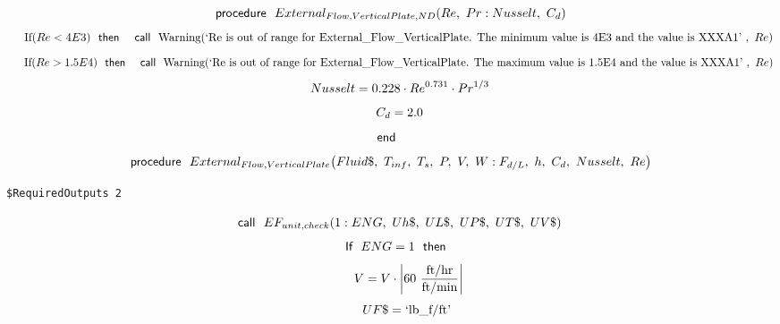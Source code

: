 \documentclass[10pt,fleqn]{article}
\newcommand{\F}[1]{\mbox{$#1$}}
\newcommand{\K}[1]{\mbox{\sf#1\ \ \mit}}
\newcommand{\KS}[1]{\mbox{\sf\ \ #1\ \ \mit}}
\newcommand{\SC}[1]{\mbox{`#1'}\  }
\newcommand{\V}[1]{\mbox{$ #1 $}}
\newcommand{\I}{\mbox{\hspace{0.20in}}}
\begin{document}
\vspace{0.1 in}
\begin{equation}
\label{EES Eqn:395}
\K{procedure} \F{External_{Flow,VerticalPlate,ND}}{ \left( \V{Re} ,\ \V{Pr} :\V{Nusselt} ,\ C_{d} \right) } 
\end{equation}
\begin{equation}
\I \label{EES Eqn:396}
\mbox{If}{ \left( \V{Re<4E3}  \right) } \KS{then} \KS{call} \mbox{Warning}{ \left( \SC{Re is out of range for External\_Flow\_VerticalPlate.  The minimum value is 4E3 and the value is XXXA1},\ \V{Re}  \right) } 
\end{equation}
\begin{equation}
\I \label{EES Eqn:397}
\mbox{If}{ \left( \V{Re>1.5E4}  \right) } \KS{then} \KS{call} \mbox{Warning}{ \left( \SC{Re is out of range for External\_Flow\_VerticalPlate.  The maximum value is 1.5E4 and the value is XXXA1},\ \V{Re}  \right) } 
\end{equation}
\begin{equation}
\I \label{EES Eqn:398}
\V{Nusselt} =0.228\cdot \V{Re} ^{0.731}\cdot \V{Pr} ^{1/3} 
\end{equation}
\begin{equation}
\I \label{EES Eqn:399}
C_{d}=2.0 
\end{equation}
\begin{equation}
\label{EES Eqn:400}
\K{end} 
\end{equation}
\vspace{0.1 in}
\begin{equation}
\label{EES Eqn:401}
\K{procedure} \F{External_{Flow,VerticalPlate}}{ \left( Fluid\$,\ T_{inf},\ T_{s},\  P,\ V,\ W: F_{d/L},\ h,\ C_{d},\ \V{Nusselt} ,\ \V{Re}  \right) } 
\end{equation}
\begin{verbatim}
$RequiredOutputs 2
\end{verbatim}  \begin{equation}
\I \label{EES Eqn:402}
\K{call} \F{EF_{unit,check}}{ \left( 1:\V{ENG} ,\ Uh\$,\ UL\$,\ UP\$,\ UT\$,\ UV\$ \right) } 
\end{equation}
\begin{equation}
\I \label{EES Eqn:403}
\K{If} \V{ENG} =1 \KS{then} 
\end{equation}
\begin{equation}
\I \I \label{EES Eqn:404}
V=V\cdot \rm { \left|60\ \frac {\rm{ft/hr}}{\rm{ft/min}}\right|} 
\end{equation}
\begin{equation}
\I \I \label{EES Eqn:405}
UF\$=\SC{lb\_f/ft} 
\end{equation}
\end{document}

